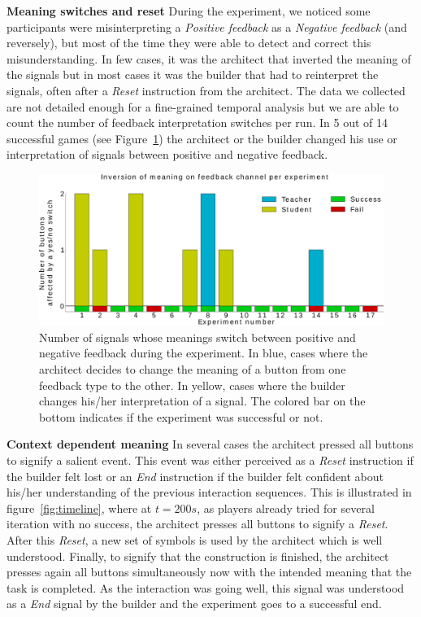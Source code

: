 {\textbf{Meaning switches and reset} During the experiment, we noticed some participants were misinterpreting a \emph{Positive feedback} as a \emph{Negative feedback} (and reversely), but most of the time they were able to detect and correct this misunderstanding. In few cases, it was the architect that inverted the meaning of the signals but in most cases it was the builder that had to reinterpret the signals, often after a \emph{Reset} instruction from the architect. The data we collected are not detailed enough for a fine-grained temporal analysis but we are able to count the number of feedback interpretation switches per run. In 5 out of 14 successful games (see Figure~\ref{fig:feedback_switch_enhanced}) the architect or the builder changed his use or interpretation of signals between positive and negative feedback.

\begin{figure}[!ht]
  \begin{center}
      \includegraphics[width=\columnwidth]{media/plots/inversion_meaning}
      \caption{Number of signals whose meanings switch between positive and negative feedback during the experiment. In blue, cases where the architect decides to change the meaning of a button from one feedback type to the other. In yellow, cases where the builder changes his/her interpretation of a signal. The colored bar on the bottom indicates if the experiment was successful or not.}
    \label{fig:feedback_switch_enhanced}
    \end{center}
\end{figure}

\textbf{Context dependent meaning} In several cases the architect pressed all buttons to signify a salient event. This event was either perceived as a \emph{Reset} instruction if the builder felt lost or an \emph{End} instruction if the builder felt confident about his/her understanding of the previous interaction sequences. This is illustrated in figure~\ref{fig:timeline}, where at $t=200 s$, as players already tried for several iteration with no success, the architect presses all buttons to signify a \emph{Reset}. After this \emph{Reset}, a new set of symbols is used by the architect which is well understood. Finally, to signify that the construction is finished, the architect presses again all buttons simultaneously now with the intended meaning that the task is completed. As the interaction was going well, this signal was understood as a \emph{End} signal by the builder and the experiment goes to a successful end.

}
